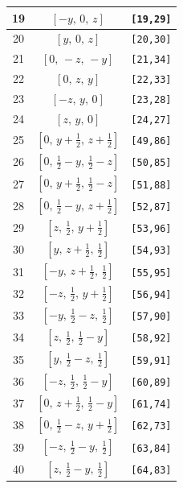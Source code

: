 \documentclass[fleqn,8pt]{jsarticle}
\begin{document}
\begin{longtable}{ccc}
19 & $\left[ - y,\, 0,\, z \right]$ & {\tt [19,29]} \\ \hline
20 & $\left[ y,\, 0,\, z \right]$ & {\tt [20,30]} \\ \hline
21 & $\left[ 0,\, - z,\, - y \right]$ & {\tt [21,34]} \\ \hline
22 & $\left[ 0,\, z,\, y \right]$ & {\tt [22,33]} \\ \hline
23 & $\left[ - z,\, y,\, 0 \right]$ & {\tt [23,28]} \\ \hline
24 & $\left[ z,\, y,\, 0 \right]$ & {\tt [24,27]} \\ \hline
25 & $\left[ 0,\, y + \frac{1}{2},\, z + \frac{1}{2} \right]$ & {\tt [49,86]} \\ \hline
26 & $\left[ 0,\, \frac{1}{2} - y,\, \frac{1}{2} - z \right]$ & {\tt [50,85]} \\ \hline
27 & $\left[ 0,\, y + \frac{1}{2},\, \frac{1}{2} - z \right]$ & {\tt [51,88]} \\ \hline
28 & $\left[ 0,\, \frac{1}{2} - y,\, z + \frac{1}{2} \right]$ & {\tt [52,87]} \\ \hline
29 & $\left[ z,\, \frac{1}{2},\, y + \frac{1}{2} \right]$ & {\tt [53,96]} \\ \hline
30 & $\left[ y,\, z + \frac{1}{2},\, \frac{1}{2} \right]$ & {\tt [54,93]} \\ \hline
31 & $\left[ - y,\, z + \frac{1}{2},\, \frac{1}{2} \right]$ & {\tt [55,95]} \\ \hline
32 & $\left[ - z,\, \frac{1}{2},\, y + \frac{1}{2} \right]$ & {\tt [56,94]} \\ \hline
33 & $\left[ - y,\, \frac{1}{2} - z,\, \frac{1}{2} \right]$ & {\tt [57,90]} \\ \hline
34 & $\left[ z,\, \frac{1}{2},\, \frac{1}{2} - y \right]$ & {\tt [58,92]} \\ \hline
35 & $\left[ y,\, \frac{1}{2} - z,\, \frac{1}{2} \right]$ & {\tt [59,91]} \\ \hline
36 & $\left[ - z,\, \frac{1}{2},\, \frac{1}{2} - y \right]$ & {\tt [60,89]} \\ \hline
37 & $\left[ 0,\, z + \frac{1}{2},\, \frac{1}{2} - y \right]$ & {\tt [61,74]} \\ \hline
38 & $\left[ 0,\, \frac{1}{2} - z,\, y + \frac{1}{2} \right]$ & {\tt [62,73]} \\ \hline
39 & $\left[ - z,\, \frac{1}{2} - y,\, \frac{1}{2} \right]$ & {\tt [63,84]} \\ \hline
40 & $\left[ z,\, \frac{1}{2} - y,\, \frac{1}{2} \right]$ & {\tt [64,83]} \\ \hline

\end{longtable}
\end{document}
